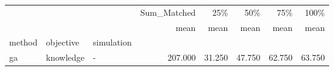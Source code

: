 \begin{tabular}{lllrrrrr}
\toprule
   &           &   & Sum\_Matched &    25\% &    50\% &    75\% &   100\% \\
   &           &   &        mean &   mean &   mean &   mean &   mean \\
method & objective & simulation &             &        &        &        &        \\
\midrule
ga & knowledge & - &     207.000 & 31.250 & 47.750 & 62.750 & 63.750 \\
\bottomrule
\end{tabular}
